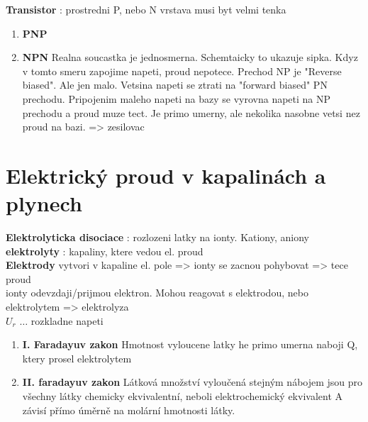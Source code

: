 \documentclass{report}
\begin{document}
\textbf{Transistor} : prostredni P, nebo N vrstava musi byt velmi tenka 
\begin{enumerate}[label=\bfseries\tiny\protect\circled{\small\arabic*}]
  \item \textbf{PNP} 
    \item \textbf{NPN} Realna soucastka je jednosmerna. Schemtaicky to ukazuje sipka. Kdyz v tomto smeru zapojime napeti, proud nepotece. Prechod NP je "Reverse biased". Ale jen malo. Vetsina napeti se ztrati na "forward biased" PN prechodu. Pripojenim maleho napeti na bazy se vyrovna  napeti na NP prechodu a proud muze tect. Je primo umerny, ale nekolika nasobne vetsi nez proud na bazi. => zesilovac
\end{enumerate}

\newpage


\section{Elektrický proud v kapalinách a plynech}

\vspace{0.5cm}
\textbf{Elektrolyticka disociace} : rozlozeni latky na ionty. Kationy, aniony \\
\textbf{elektrolyty} : kapaliny, ktere vedou el. proud \\
\textbf{Elektrody} vytvori v kapaline el. pole => ionty se zacnou pohybovat => tece proud \\
ionty odevzdaji/prijmou elektron. Mohou reagovat s elektrodou, nebo elektrolytem => elektrolyza \\
$U_r$ $\ldots$ rozkladne napeti \\

\begin{enumerate}[label=\bfseries\tiny\protect\circled{\small\arabic*}]
  \item \textbf{I. Faradayuv zakon} Hmotnost vyloucene latky he primo umerna naboji Q, ktery prosel elektrolytem
  \item \textbf{II. faradayuv zakon} Látková množství vyloučená stejným nábojem jsou pro všechny látky chemicky ekvivalentní, neboli elektrochemický ekvivalent A závisí přímo úměrně na molární hmotnosti látky.
\end{enumerate}
\end{document}
